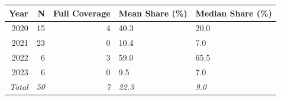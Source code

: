 \begin{tabular}[t]{rrrll}
\toprule
Year & N & Full Coverage & Mean Share (\%) & Median Share (\%)\\
\midrule
2020 & 15 & 4 & 40.3 & 20.0\\
2021 & 23 & 0 & 10.4 & 7.0\\
2022 & 6 & 3 & 59.0 & 65.5\\
2023 & 6 & 0 & 9.5 & 7.0\\
\midrule
\textit{Total} & \textit{50} & \textit{7} & \textit{22.3} & \textit{9.0}\\
\bottomrule
\end{tabular}
